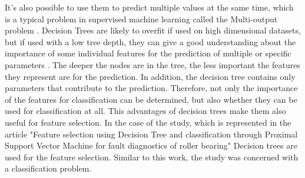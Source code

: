\documentclass[../masterarbeit.tex]{subfiles}
\begin{document}
It's also possible to use them to predict multiple values at the same time, which is a typical problem in supervised machine learning called the Multi-output problem \textcite[]{Scikit-learn-decision-tree:2022}.
Decision Trees are likely to overfit if used on high dimensional datasets, but if used with a low tree depth, they can give a good understanding about the importance of some individual features for the prediction of multiple or specific parameters \textcite[]{Scikit-learn-decision-tree:2022}. The deeper the nodes are in the tree, the less important the features they represent are for the prediction. In addition, the decision tree contains only parameters that contribute to the prediction.
Therefore, not only the importance of the features for classification can be determined, but also whether they can be used for classification at all. \autocite[]{SUGUMARAN2007930}
This advantages of decision trees make them also useful for feature selection. 
In the case of the study, which is represented in the article "Feature selection using Decision Tree and classification through Proximal Support Vector Machine for fault diagnostics of roller bearing" \textcite[]{SUGUMARAN2007930} Decision trees are used for the feature selection. Similar to this work, the study was concerned with a classification problem.
\end{document}

